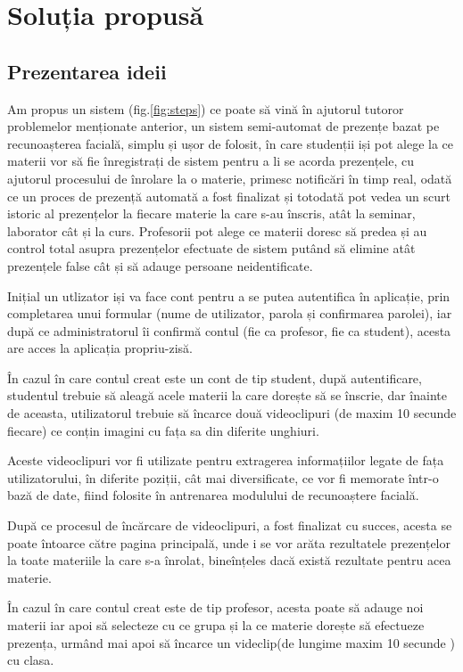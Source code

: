 \documentclass[a4paper, 12pt]{article}
\begin{document}
	\newpage
	\bigskip
	\section{Soluția propusă}
	
	\bigskip
	\subsection{Prezentarea ideii}
	\quad\space Am propus un sistem (fig.\ref{fig:steps}) ce poate să vină în ajutorul tutoror problemelor menționate anterior, un sistem semi-automat de prezențe bazat pe recunoașterea facială, simplu și ușor de folosit, în care studenții iși pot alege la ce materii vor să fie înregistrați de sistem pentru a li se acorda prezențele, cu ajutorul procesului de înrolare la o materie, primesc notificări în timp real, odată ce un proces de prezență automată a fost finalizat și totodată pot vedea un scurt istoric al prezențelor la fiecare materie la care s-au înscris, atât la seminar, laborator cât și la curs. Profesorii pot alege ce materii doresc să predea și au control total asupra prezențelor efectuate de sistem putând să elimine atât prezențele false cât și să adauge persoane neidentificate.
	
	Inițial un utlizator iși va face cont pentru a se putea autentifica în aplicație, prin completarea unui formular (nume de utilizator, parola și confirmarea parolei), iar după ce administratorul îi confirmă contul (fie ca profesor, fie ca student), acesta are acces la aplicația propriu-zisă.
	
	În cazul în care contul creat este un cont de tip student, după autentificare, studentul trebuie să aleagă acele materii la care dorește să se înscrie, dar înainte de aceasta, utilizatorul trebuie să încarce două videoclipuri (de maxim 10 secunde fiecare) ce conțin imagini cu fața sa din diferite unghiuri.
	
	Aceste videoclipuri vor fi utilizate pentru extragerea informațiilor legate de fața utilizatorului, în diferite poziții, cât mai diversificate, ce vor fi memorate într-o bază de date, fiind folosite în antrenarea modulului de recunoaștere facială.
	
	După ce procesul de încărcare de videoclipuri, a fost finalizat cu succes, acesta se poate întoarce către pagina principală, unde i se vor arăta rezultatele prezențelor la toate materiile la care s-a înrolat, bineînțeles dacă există rezultate pentru acea materie.
	
	În cazul în care contul creat este de tip profesor, acesta poate să adauge noi materii iar apoi să selecteze cu ce grupa și la ce materie dorește să efectueze prezența, urmând mai apoi să încarce un videclip(de lungime maxim 10 secunde ) cu clasa.
	
\end{document}
